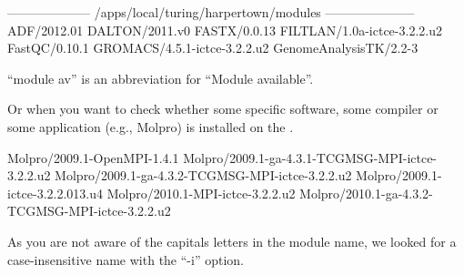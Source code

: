 \begin{prompt}
-------------------- /apps/local/turing/harpertown/modules ---------------------
ADF/2012.01
DALTON/2011.v0
FASTX/0.0.13
FILTLAN/1.0a-ictce-3.2.2.u2
FastQC/0.10.1
GROMACS/4.5.1-ictce-3.2.2.u2
GenomeAnalysisTK/2.2-3
\end{prompt}

``module av'' is an abbreviation for ``Module available''.

Or when you want to check whether some specific software, some compiler or some
application (e.g., Molpro) is installed on the \hpc.

\begin{prompt}
Molpro/2009.1-OpenMPI-1.4.1
Molpro/2009.1-ga-4.3.1-TCGMSG-MPI-ictce-3.2.2.u2
Molpro/2009.1-ga-4.3.2-TCGMSG-MPI-ictce-3.2.2.u2
Molpro/2009.1-ictce-3.2.2.013.u4
Molpro/2010.1-MPI-ictce-3.2.2.u2
Molpro/2010.1-ga-4.3.2-TCGMSG-MPI-ictce-3.2.2.u2
\end{prompt}

As you are not aware of the capitals letters in the module name, we looked for
a case-insensitive name with the ``-i'' option.
